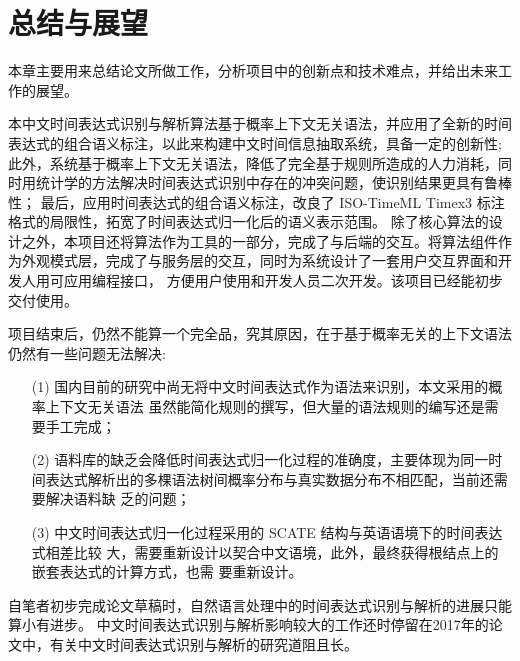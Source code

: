 
\chapter{总结与展望}

本章主要用来总结论文所做工作，分析项目中的创新点和技术难点，并给出未来工作的展望。

本中文时间表达式识别与解析算法基于概率上下文无关语法，并应用了全新的时间表达式的组合语义标注，以此来构建中文时间信息抽取系统，具备一定的创新性;
此外，系统基于概率上下文无关语法，降低了完全基于规则所造成的人力消耗，同时用统计学的方法解决时间表达式识别中存在的冲突问题，使识别结果更具有鲁棒性；
最后，应用时间表达式的组合语义标注，改良了 ISO-TimeML Timex3 标注格式的局限性，拓宽了时间表达式归一化后的语义表示范围。
除了核心算法的设计之外，本项目还将算法作为工具的一部分，完成了与后端的交互。将算法组件作为外观模式层，完成了与服务层的交互，同时为系统设计了一套用户交互界面和开发人用可应用编程接口，
方便用户使用和开发人员二次开发。该项目已经能初步交付使用。

项目结束后，仍然不能算一个完全品，究其原因，在于基于概率无关的上下文语法仍然有一些问题无法解决:
\begin{enumerate}
    \item[(1)] 国内目前的研究中尚无将中文时间表达式作为语法来识别，本文采用的概率上下文无关语法
          虽然能简化规则的撰写，但大量的语法规则的编写还是需要手工完成；
    \item[(2)] 语料库的缺乏会降低时间表达式归一化过程的准确度，主要体现为同一时
          间表达式解析出的多棵语法树间概率分布与真实数据分布不相匹配，当前还需要解决语料缺
          乏的问题；
    \item[(3)] 中文时间表达式归一化过程采用的 SCATE 结构与英语语境下的时间表达式相差比较
          大，需要重新设计以契合中文语境，此外，最终获得根结点上的嵌套表达式的计算方式，也需
          要重新设计。
\end{enumerate}

自笔者初步完成论文草稿时，自然语言处理中的时间表达式识别与解析的进展只能算小有进步。
中文时间表达式识别与解析影响较大的工作还时停留在2017年的论文中，有关中文时间表达式识别与解析的研究道阻且长。